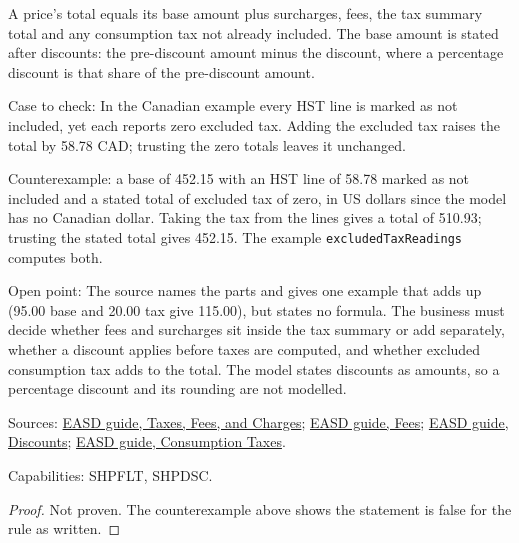 \begin{theorem}
  \label{thm:offers-price-total-from-parts}
  A price's total equals its base amount plus surcharges, fees, the tax
  summary total and any consumption tax not already included. The base
  amount is stated after discounts: the pre-discount amount minus the
  discount, where a percentage discount is that share of the pre-discount
  amount.

  Case to check: In the Canadian example every HST line is marked as not
  included, yet each reports zero excluded tax. Adding the excluded tax
  raises the total by 58.78 CAD; trusting the zero totals leaves it
  unchanged.

  Counterexample: a base of 452.15 with an HST line of 58.78 marked as not
  included and a stated total of excluded tax of zero, in US dollars since
  the model has no Canadian dollar. Taking the tax from the lines gives a
  total of 510.93; trusting the stated total gives 452.15. The example
  \texttt{excludedTaxReadings} computes both.

  Open point: The source names the parts and gives one example that adds up
  (95.00 base and 20.00 tax give 115.00), but states no formula. The
  business must decide whether fees and surcharges sit inside the tax
  summary or add separately, whether a discount applies before taxes are
  computed, and whether excluded consumption tax adds to the total. The
  model states discounts as amounts, so a percentage discount and its
  rounding are not modelled.

  Sources: \href{https://standards.atlassian.net/wiki/spaces/EASD/pages/574455915/Taxes+Fees+and+Charges}{EASD guide, Taxes, Fees, and Charges};
  \href{https://standards.atlassian.net/wiki/spaces/EASD/pages/574914636/Fees}{EASD guide, Fees};
  \href{https://standards.atlassian.net/wiki/spaces/EASD/pages/574849038/Discounts}{EASD guide, Discounts};
  \href{https://standards.atlassian.net/wiki/spaces/EASD/pages/2588377182/Consumption+Taxes}{EASD guide, Consumption Taxes}.

  Capabilities: SHPFLT, SHPDSC.
\end{theorem}
\begin{proof}
  Not proven. The counterexample above shows the statement is false for the
  rule as written.
\end{proof}

